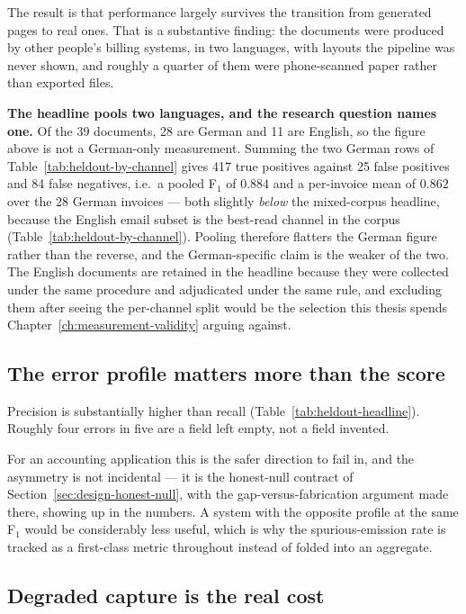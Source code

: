 

The result is that performance largely survives the transition from generated pages to real
ones. That is a substantive finding: the documents were produced by other people's billing
systems, in two languages, with layouts the pipeline was never shown, and roughly a quarter of
them were phone-scanned paper rather than exported files.

\textbf{The headline pools two languages, and the research question names one.} Of the 39
documents, 28 are German and 11 are English, so the figure above is not a German-only
measurement. Summing the two German rows of Table~\ref{tab:heldout-by-channel} gives 417 true
positives against 25 false positives and 84 false negatives, i.e.\ a pooled F$_1$ of
$0.884$ and a per-invoice mean of $0.862$ over the 28 German invoices --- both slightly
\emph{below} the mixed-corpus headline, because the English email subset is the
best-read channel in the corpus (Table~\ref{tab:heldout-by-channel}). Pooling therefore
flatters the German figure rather than the reverse, and the German-specific claim is the
weaker of the two. The English documents are retained in the headline because they were
collected under the same procedure and adjudicated under the same rule, and excluding them
after seeing the per-channel split would be the selection this thesis spends
Chapter~\ref{ch:measurement-validity} arguing against.

\subsection{The error profile matters more than the score}

Precision is substantially higher than recall (Table~\ref{tab:heldout-headline}). Roughly four
errors in five are a field left empty, not a field invented.

For an accounting application this is the safer direction to fail in, and the asymmetry is not
incidental --- it is the honest-null contract of Section~\ref{sec:design-honest-null}, with the
gap-versus-fabrication argument made there, showing up in the numbers. A system with the
opposite profile at the same F$_1$ would be considerably less useful, which is why the
spurious-emission rate is tracked as a first-class metric throughout instead of folded into
an aggregate.

\subsection{Degraded capture is the real cost}

